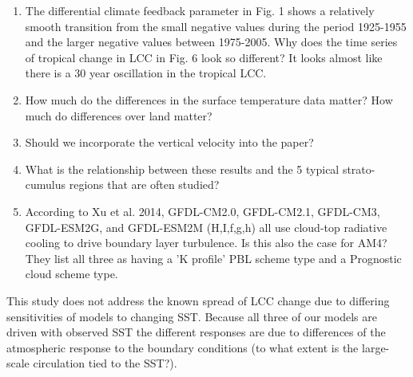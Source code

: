 \documentclass[grl]{agutex2015}
\begin{document}
\begin{article}
\begin{enumerate}
\item The differential climate feedback parameter in Fig. 1 shows a relatively smooth transition from the small negative values during the period 1925-1955 and the larger negative values between 1975-2005.  Why does the time series of tropical change in LCC in Fig. 6 look so different?     It looks almost like there is a 30 year oscillation in the tropical LCC.  

\item How much do the differences in the surface temperature data matter?  How much do differences over land matter?  

\item Should we incorporate the vertical velocity into the paper?  

\item What is the relationship between these results and the 5 typical strato-cumulus regions that are often studied? 

\item According to Xu et al. 2014, GFDL-CM2.0, GFDL-CM2.1, GFDL-CM3, GFDL-ESM2G, and GFDL-ESM2M (H,I,f,g,h) all use cloud-top radiative cooling to drive boundary layer turbulence.  Is this also the case for AM4?  They list all three as having a 'K profile' PBL scheme type and a Prognostic cloud scheme type.  

\end{enumerate}
This study does not address the known spread of LCC change due to differing sensitivities of models to changing SST.  Because all three of our models are driven with observed SST the different responses are due to differences of the atmospheric response to the boundary conditions (to what extent is the large-scale circulation tied to the SST?).  

%
%
%
%


\end{article}
\end{document}
